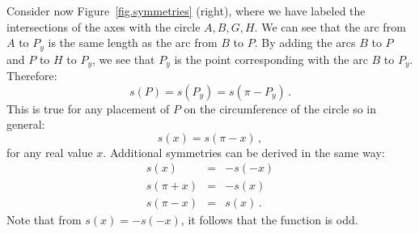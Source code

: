 Consider now Figure~\ref{fig.symmetries} (right), where we have labeled the intersections of the axes with the circle $A,B,G,H$. We can see that the arc from $A$ to $P_y$ is the same length as the arc from $B$ to $P$. By adding the arcs $B$ to $P$ and $P$ to $H$ to $P_y$, we see that $P_y$ is the point corresponding with the arc $B$ to $P_y$. Therefore:
\[
s(P) = s(P_y) = s(\pi - P_y)\,.
\]
This is true for any placement of $P$ on the circumference of the circle so in general:
\[
s(x) = s(\pi - x)\,,
\]
for any real value $x$. Additional symmetries can be derived in the same way:
\begin{eqnarray*}
s(x) &=& -s(-x)\\
s(\pi+x) &=& -s(x)\\
s(\pi-x) &=& s(x)\,.
\end{eqnarray*}
Note that from $s(x) = -s(-x)$, it follows that the function is odd.


